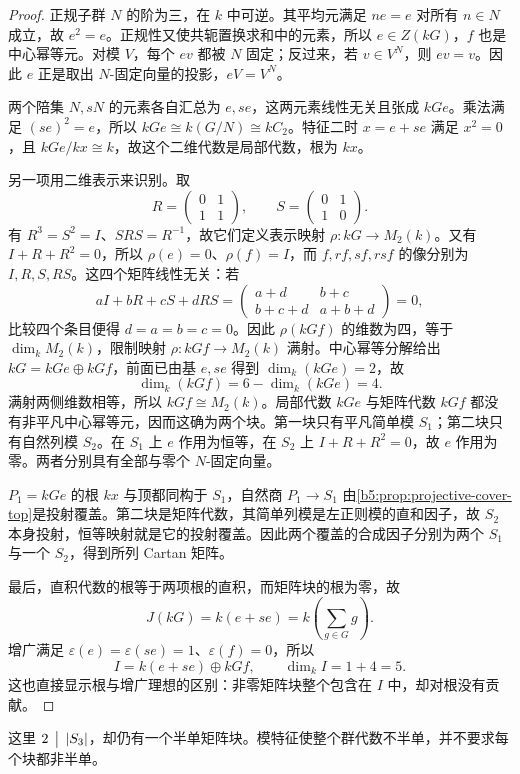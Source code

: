 \begin{proof}
	正规子群 \(N\) 的阶为三，在 \(k\) 中可逆。其平均元满足 \(ne=e\) 对所有 \(n\in N\) 成立，故 \(e^2=e\)。正规性又使共轭置换求和中的元素，所以 \(e\in Z(kG)\)，\(f\) 也是中心幂等元。对模 \(V\)，每个 \(ev\) 都被 \(N\) 固定；反过来，若 \(v\in V^N\)，则 \(ev=v\)。因此 \(e\) 正是取出 \(N\)-固定向量的投影，\(eV=V^N\)。

	两个陪集 \(N,sN\) 的元素各自汇总为 \(e,se\)，这两元素线性无关且张成 \(kGe\)。乘法满足 \((se)^2=e\)，所以 \(kGe\cong k(G/N)\cong kC_2\)。特征二时 \(x=e+se\) 满足 \(x^2=0\)，且 \(kGe/kx\cong k\)，故这个二维代数是局部代数，根为 \(kx\)。

	另一项用二维表示来识别。取
	\[
		R=\begin{pmatrix}0&1\\1&1\end{pmatrix},\qquad
		S=\begin{pmatrix}0&1\\1&0\end{pmatrix}.
	\]
	有 \(R^3=S^2=I\)、\(SRS=R^{-1}\)，故它们定义表示映射 \(\rho:kG\to M_2(k)\)。又有 \(I+R+R^2=0\)，所以 \(\rho(e)=0\)、\(\rho(f)=I\)，而 \(f,rf,sf,rsf\) 的像分别为 \(I,R,S,RS\)。这四个矩阵线性无关：若
	\[
		aI+bR+cS+dRS
		=\begin{pmatrix}a+d&b+c\\b+c+d&a+b+d\end{pmatrix}=0,
	\]
	比较四个条目便得 \(d=a=b=c=0\)。因此 \(\rho(kGf)\) 的维数为四，等于 \(\dim_kM_2(k)\)，限制映射 \(\rho:kGf\to M_2(k)\) 满射。中心幂等分解给出 \(kG=kGe\oplus kGf\)，前面已由基 \(e,se\) 得到 \(\dim_k(kGe)=2\)，故
	\[
		\dim_k(kGf)=6-\dim_k(kGe)=4.
	\]
	满射两侧维数相等，所以 \(kGf\cong M_2(k)\)。局部代数 \(kGe\) 与矩阵代数 \(kGf\) 都没有非平凡中心幂等元，因而这确为两个块。第一块只有平凡简单模 \(S_1\)；第二块只有自然列模 \(S_2\)。在 \(S_1\) 上 \(e\) 作用为恒等，在 \(S_2\) 上 \(I+R+R^2=0\)，故 \(e\) 作用为零。两者分别具有全部与零个 \(N\)-固定向量。

	\(P_1=kGe\) 的根 \(kx\) 与顶都同构于 \(S_1\)，自然商 \(P_1\to S_1\) 由\cref{b5:prop:projective-cover-top}是投射覆盖。第二块是矩阵代数，其简单列模是左正则模的直和因子，故 \(S_2\) 本身投射，恒等映射就是它的投射覆盖。因此两个覆盖的合成因子分别为两个 \(S_1\) 与一个 \(S_2\)，得到所列 Cartan 矩阵。

	最后，直积代数的根等于两项根的直积，而矩阵块的根为零，故
	\[
		J(kG)=k(e+se)=k\!\left(\sum_{g\in G}g\right).
	\]
	增广满足 \(\varepsilon(e)=\varepsilon(se)=1\)、\(\varepsilon(f)=0\)，所以
	\[
		I=k(e+se)\oplus kGf, \qquad \dim_k I=1+4=5.
	\]
	这也直接显示根与增广理想的区别：非零矩阵块整个包含在 \(I\) 中，却对根没有贡献。
\end{proof}
这里 \(2\,\bigm\vert\,|S_3|\)，却仍有一个半单矩阵块。模特征使整个群代数不半单，并不要求每个块都非半单。
